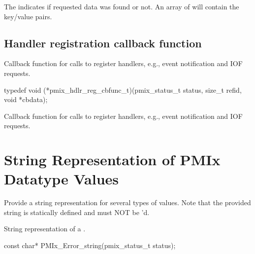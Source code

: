 The  indicates if requested data was found or not.
An array of  will contain the key/value pairs.

\subsection{Handler registration callback function}

\summary

Callback function for calls to register handlers, e.g., event notification and IOF requests.

\format

\cspecificstart
\begin{codepar}
typedef void (*pmix_hdlr_reg_cbfunc_t)(pmix_status_t status,
                                       size_t refid,
                                       void *cbdata);
\end{codepar}
\cspecificend

\begin{arglist}
\end{arglist}

\descr

Callback function for calls to register handlers, e.g., event notification and IOF requests.



\section{String Representation of PMIx Datatype Values}

Provide a string representation for several types of values.
Note that the provided string is statically defined and must NOT be 'd.

\summary
{}

String representation of a .

\cspecificstart
\begin{codepar}
const char*
PMIx_Error_string(pmix_status_t status);
\end{codepar}
\cspecificend

